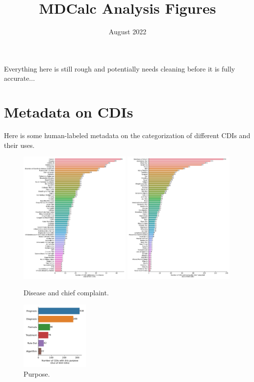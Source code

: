 \documentclass[10pt]{article}
\title{MDCalc Analysis Figures}
\author{}
\date{August 2022}
\begin{document}
\maketitle

Everything here is still rough and potentially needs cleaning before it is fully accurate...

\section{Metadata on CDIs}

Here is some human-labeled metadata on the categorization of different CDIs and their uses. 

\begin{figure}[H]
    \centering
    \includegraphics[width=0.49\textwidth]{../results/disease_en.pdf}
    \includegraphics[width=0.49\textwidth]{../results/chief_complaint_en.pdf}
    \caption{Disease and chief complaint.}
\end{figure}

\begin{figure}[H]
    \centering
    \includegraphics[width=0.3\textwidth]{../results/purpose_en.pdf}
    \caption{Purpose.}
\end{figure}
\end{document}
